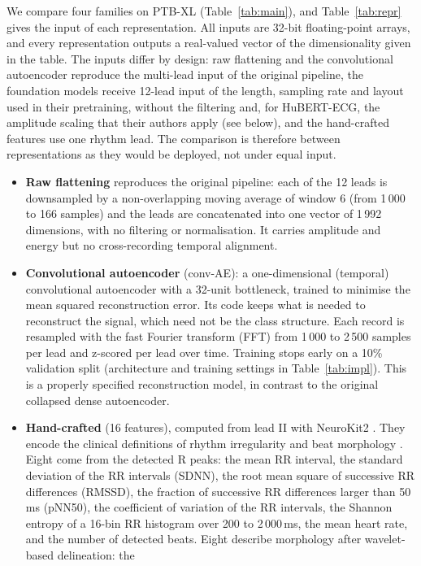 \documentclass[preprint,11pt]{elsarticle}
\begin{document}
We compare four families on PTB-XL (Table~\ref{tab:main}), and Table~\ref{tab:repr} gives
the input of each representation. All inputs are 32-bit floating-point arrays, and every
representation outputs a real-valued vector of the dimensionality given in the table.
The inputs differ by design: raw flattening and the convolutional autoencoder reproduce
the multi-lead input of the original pipeline, the foundation models receive 12-lead
input of the length, sampling rate and layout used in their pretraining, without the
filtering and, for HuBERT-ECG, the amplitude scaling that their authors apply (see below),
and the hand-crafted features use one rhythm lead. The comparison is therefore between representations as they would be deployed,
not under equal input.
\begin{itemize}
\item \textbf{Raw flattening} reproduces the original pipeline: each of the 12 leads is
downsampled by a non-overlapping moving average of window 6 (from 1\,000 to 166 samples)
and the leads are concatenated into one vector of 1\,992 dimensions, with no filtering or
normalisation. It carries amplitude and energy but no cross-recording temporal alignment.
\item \textbf{Convolutional autoencoder} (conv-AE): a one-dimensional (temporal)
convolutional autoencoder with a 32-unit bottleneck, trained to minimise the mean squared
reconstruction error. Its code keeps what is needed to reconstruct the signal, which need
not be the class structure. Each record is resampled with the fast Fourier transform (FFT)
from 1\,000 to 2\,500 samples per lead and z-scored per lead over time. Training stops
early on a 10\% validation split (architecture and training settings in
Table~\ref{tab:impl}). This is a properly specified reconstruction model, in contrast to
the original collapsed dense autoencoder.
\item \textbf{Hand-crafted} (16 features), computed from lead II with NeuroKit2
\cite{neurokit2021}. They encode the clinical definitions of rhythm irregularity and beat
morphology \cite{hrvstandards1996,dechazal2004}. Eight come from the detected R peaks:
the mean RR interval, the standard deviation of the RR intervals (SDNN), the root mean
square of successive RR differences (RMSSD), the fraction of successive RR differences
larger than 50\,ms (pNN50), the coefficient of variation of the RR intervals, the Shannon
entropy of a 16-bin RR histogram over 200 to 2\,000\,ms, the mean heart rate, and the
number of detected beats. Eight describe morphology after wavelet-based delineation: the

\end{itemize}
\end{document}

